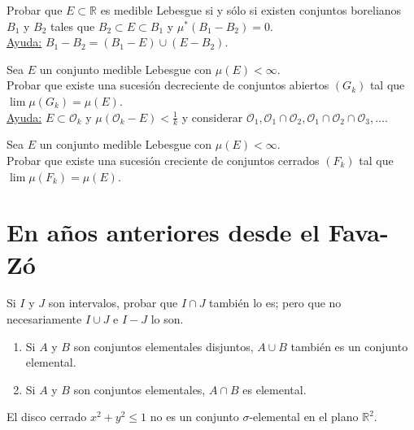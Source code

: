 \documentclass{book}
\newcommand{\rr}{\mathbb{R}}
\begin{document}
\begin{ejer}{}
Probar que $E\subset \rr$ es medible Lebesgue si y s\'olo si existen conjuntos borelianos $B_1$
 y $B_2$ tales que $B_2\subset E\subset B_1$ y $\mu^*(B_1-B_2)=0$.
\\
\underline{Ayuda:} $B_1-B_2=(B_1-E)\cup (E-B_2)$. 
\end{ejer} 


\begin{ejer}{} 
 Sea $E$ un conjunto medible Lebesgue con $\mu(E)<\infty$.
\\Probar que existe una sucesi\'on decreciente de conjuntos abiertos $(G_k)$ tal que
$\lim \mu(G_k)=\mu (E)$.
\\
\underline{Ayuda:} $E\subset \mathcal{O}_k$ y $\mu(\mathcal{O}_k-E)<\frac{1}{k}$
y considerar 
$\mathcal{O}_1,\mathcal{O}_1\cap\mathcal{O}_2,\mathcal{O}_1\cap\mathcal{O}_2\cap\mathcal{O}_3,\dots$.
\end{ejer} 



\begin{ejer}{} 
 Sea  $E$ un conjunto medible Lebesgue con $\mu(E)<\infty$.\\
Probar que existe una sucesi\'on creciente de conjuntos cerrados $(F_k)$ tal que
$\lim \mu(F_k)=\mu (E)$.
\end{ejer} 


\section{En a\~nos anteriores desde el Fava-Z\'o}


\begin{ejer} {}
Si $I$ y $J$ son intervalos, probar que $I \cap J$ también lo es; pero que 
  no necesariamente $I \cup J$ e $I-J$ lo son. 
 \end{ejer}
  
 \begin{ejer}{}
	\begin{enumerate}
  \item Si $A$ y $B$ son conjuntos elementales disjuntos, $A \cup B$ también es 
  un conjunto elemental.
  \item Si $A$  y $B$ son conjuntos elementales, $A \cap B$ es elemental.
	\end{enumerate}
\end{ejer}
	
\begin{ejer}{}
  El disco cerrado $x^2+y^2\leq 1$ no es un conjunto $\sigma$-elemental en el plano
  $\rr^2$.
	\end{ejer}
\end{document}
